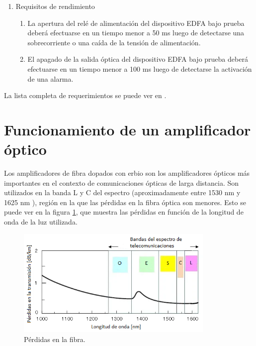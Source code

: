\begin{enumerate}
\item Requisitos de rendimiento
	\begin{enumerate}
	\item \label{item:req1} La apertura del relé de alimentación del dispositivo EDFA 		bajo prueba deberá efectuarse en un tiempo menor a 50 ms luego de 		detectarse una sobrecorriente o una caída de la tensión de 				alimentación.
	\item \label{item:req2} El apagado de la salida óptica del dispositivo EDFA bajo 			prueba deberá efectuarse en un tiempo menor a 100 ms luego de 			detectarse la activación de una alarma.
	\end{enumerate}
	
\end{enumerate}

La lista completa de requerimientos se puede ver en \citep{DOC_REQ}.

\section{Funcionamiento de un amplificador óptico}
\label{sec:funcAmp}

Los amplificadores de fibra dopados con erbio son los amplificadores ópticos más importantes en el contexto de comunicaciones ópticas de larga distancia. Son utilizados en la banda L y C del espectro (aproximadamente entre 1530 nm y 1625 nm \citep{WEBSITE:BANDAS}), región en la que las pérdidas en la fibra óptica son menores. Esto se puede ver en la figura \ref{fig:espectro}, que muestra las pérdidas en función de la longitud de onda de la luz utilizada.

\begin{figure}[H]
\centering
\includegraphics[width=0.85\textwidth]{./Figures/espectro.png}
\caption{Pérdidas en la fibra\protect\footnotemark.}
\label{fig:espectro}
\end{figure}

